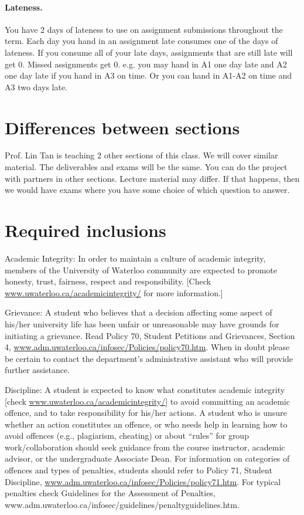 \documentclass{article}
\begin{document}
\paragraph{Lateness.} You have 2 days of lateness to use on assignment 
submissions throughout the term. Each day you hand in an assignment
late consumes one of the days of lateness. If you consume all of your
late days, assignments that are still late will get 0. Missed assignments get 0.
e.g. you may hand in A1 one day late and A2 one day late if
you hand in A3 on time.  Or you can hand in A1-A2 on time and
A3 two days late.

\section*{Differences between sections}
Prof. Lin Tan is teaching 2 other sections of this class. We will
cover similar material. The deliverables and exams will be
the same.  You can do the project with partners in other sections.
Lecture material may differ. If that happens, then we would have
exams where you have some choice of which question to answer.

\section*{Required inclusions}
\small \vspace*{-1em}
Academic Integrity: In order to maintain a culture of academic
integrity, members of the University of Waterloo community are
expected to promote honesty, trust, fairness, respect and
responsibility. [Check \url{www.uwaterloo.ca/academicintegrity/} for more
  information.]

\noindent
Grievance: A student who believes that a decision affecting some
aspect of his/her university life has been unfair or unreasonable may
have grounds for initiating a grievance. Read Policy 70, Student
Petitions and Grievances, Section 4,
\url{www.adm.uwaterloo.ca/infosec/Policies/policy70.htm}.  When in doubt
please be certain to contact the department’s administrative assistant
who will provide further assistance.

\noindent
Discipline: A student is expected to know what constitutes academic
integrity [check \url{www.uwaterloo.ca/academicintegrity/}] to avoid
committing an academic offence, and to take responsibility for his/her
actions. A student who is unsure whether an action constitutes an
offence, or who needs help in learning how to avoid offences (e.g.,
plagiarism, cheating) or about “rules” for group work/collaboration
should seek guidance from the course instructor, academic advisor, or
the undergraduate Associate Dean. For information on categories of
offences and types of penalties, students should refer to Policy 71,
Student Discipline,
\url{www.adm.uwaterloo.ca/infosec/Policies/policy71.htm}. For typical
penalties check Guidelines for the Assessment of Penalties,
www.adm.uwaterloo.ca/infosec/guidelines/penaltyguidelines.htm.
\end{document}

